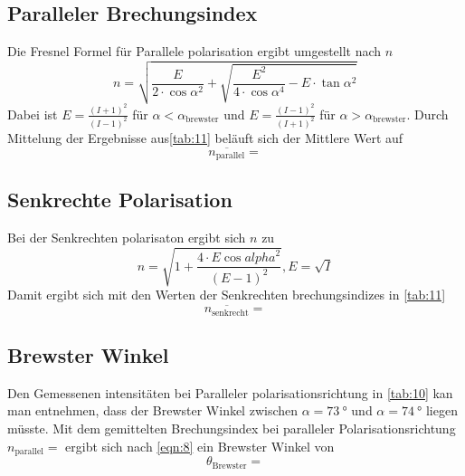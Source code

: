 \subsection{Paralleler Brechungsindex}
\label{sec:10}
Die Fresnel Formel für Parallele polarisation ergibt umgestellt nach $n$
\begin{equation}
n = \sqrt{\frac{E}{2\cdot\cos{\alpha}^2} + \sqrt{\frac{E^2}{4\cdot\cos{\alpha}^4} - E \cdot \tan{\alpha}^2}}
\end{equation}
Dabei ist $E = \frac{(I+1)^2}{(I - 1)^2}$ für $\alpha < \alpha_\text{brewster}$ und  
$E = \frac{(I-1)^2}{(I + 1)^2}$ für $\alpha > \alpha_\text{brewster}$. 
Durch Mittelung der Ergebnisse aus\autoref{tab:11} beläuft sich der Mittlere Wert auf 
\begin{equation}
  \overline{n_\text{parallel}} = 
\end{equation}

\subsection{Senkrechte Polarisation}
\label{sec:11}
Bei der Senkrechten polarisaton ergibt sich $n$ zu
\begin{equation}
n = \sqrt{1+\frac{4\cdot E \cos{alpha}^2}{(E-1)^2}}  , E = \sqrt{I}
\end{equation}
Damit ergibt sich mit den Werten der Senkrechten brechungsindizes in \autoref{tab:11} 
\begin{equation}
 \overline{n_\text{senkrecht}} = 
\end{equation}
\subsection{Brewster Winkel}
Den Gemessenen intensitäten bei Paralleler polarisationsrichtung in \autoref{tab:10} kan man entnehmen, dass 
der Brewster Winkel zwischen $\alpha = \qty{73}{\degree}$ und $\alpha = \qty{74}{\degree}$ liegen müsste. Mit dem 
gemittelten Brechungsindex bei paralleler Polarisationsrichtung $n_\text{parallel} = $ ergibt sich nach \autoref{eqn:8}
ein Brewster Winkel von
\begin{equation}
 \theta_\text{Brewster} = 
\end{equation}

